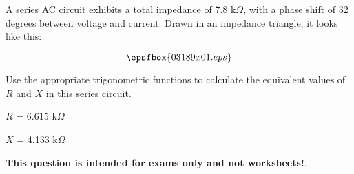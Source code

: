 

A series AC circuit exhibits a total impedance of 7.8 k$\Omega$, with a phase shift of 32 degrees between voltage and current.  Drawn in an impedance triangle, it looks like this:

$$\epsfbox{03189x01.eps}$$

Use the appropriate trigonometric functions to calculate the equivalent values of $R$ and $X$ in this series circuit.







$R$ = 6.615 k$\Omega$

$X$ = 4.133 k$\Omega$







{\bf This question is intended for exams only and not worksheets!}.





